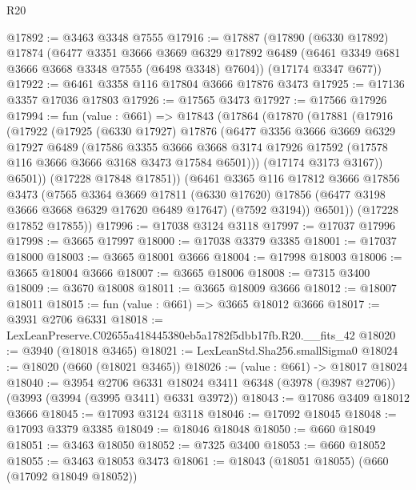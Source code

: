 \begin{lexlean}{R20}
\begin{coremodule}
@17892 := @3463 @3348 @7555
@17916 := @17887
    (@17890
      (@6330 @17892)
      @17874
      (@6477
        @3351
        @3666
        @3669
        @6329
        @17892
        @6489
        (@6461 @3349 @681 @3666 @3668 @3348 @7555 (@6498 @3348) @7604))
      (@17174 @3347 @677))
@17922 := @6461 @3358 @116 @17804 @3666 @17876 @3473
@17925 := @17136 @3357 @17036 @17803
@17926 := @17565 @3473
@17927 := @17566 @17926
@17994 := fun (value : @661) =>
  @17843
    (@17864
      (@17870
        (@17881
          (@17916
            (@17922
              (@17925
                (@6330 @17927)
                @17876
                (@6477
                  @3356
                  @3666
                  @3669
                  @6329
                  @17927
                  @6489
                  (@17586
                    @3355
                    @3666
                    @3668
                    @3174
                    @17926
                    @17592
                    (@17578 @116 @3666 @3666 @3168 @3473 @17584 @6501)))
                (@17174 @3173 @3167))
              @6501))
          (@17228 @17848 @17851))
        (@6461
          @3365
          @116
          @17812
          @3666
          @17856
          @3473
          (@7565
            @3364
            @3669
            @17811
            (@6330 @17620)
            @17856
            (@6477 @3198 @3666 @3668 @6329 @17620 @6489 @17647)
            (@7592 @3194))
          @6501))
      (@17228 @17852 @17855))
@17996 := @17038 @3124 @3118
@17997 := @17037 @17996
@17998 := @3665 @17997
@18000 := @17038 @3379 @3385
@18001 := @17037 @18000
@18003 := @3665 @18001 @3666
@18004 := @17998 @18003
@18006 := @3665 @18004 @3666
@18007 := @3665 @18006
@18008 := @7315 @3400
@18009 := @3670 @18008
@18011 := @3665 @18009 @3666
@18012 := @18007 @18011
@18015 := fun (value : @661) => @3665 @18012 @3666
@18017 := @3931 @2706 @6331
@18018 := LexLeanPreserve.C02655a418445380eb5a1782f5dbb17fb.R20.__fits_42
@18020 := @3940 (@18018 @3465)
@18021 := LexLeanStd.Sha256.smallSigma0
@18024 := @18020 (@660 (@18021 @3465))
@18026 := (value : @661) -> @18017 @18024
@18040 := @3954
    @2706
    @6331
    @18024
    @3411
    @6348
    (@3978 (@3987 @2706))
    (@3993 (@3994 (@3995 @3411) @6331 @3972))
@18043 := @17086 @3409 @18012 @3666
@18045 := @17093 @3124 @3118
@18046 := @17092 @18045
@18048 := @17093 @3379 @3385
@18049 := @18046 @18048
@18050 := @660 @18049
@18051 := @3463 @18050
@18052 := @7325 @3400
@18053 := @660 @18052
@18055 := @3463 @18053 @3473
@18061 := @18043 (@18051 @18055) (@660 (@17092 @18049 @18052))

\end{coremodule}
\end{lexlean}
